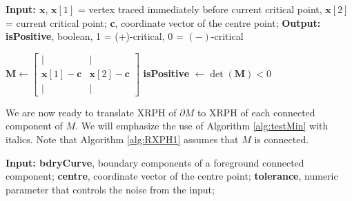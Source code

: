 \documentclass[a4paper,11pt]{article}
\theoremstyle{definition}
\begin{document}
\begin{algorithm}[H]
    \caption{\textbf{computeSign.}}\label{alg:testMin}
    \begin{algorithmic}
        \State \textbf{Input: $\boldsymbol{x}$}, $\boldsymbol{x}[1]$ =  vertex traced immediately before current critical point, 
        \State\;\;\;\;\;\;\;\;\;\;\;\;\;\;\;\;\;\;\;\;\;\;\;\;\;\;\;\;$\boldsymbol{x}[2]$ = current critical point;
        \State\;\;\;\;\;\;\;\;\;\;\;\; \textbf{c}, coordinate vector of the centre point;
        \State \textbf{Output: isPositive}, boolean, 1 = (+)-critical, 0 = $(-)$-critical
    

    \State $\boldsymbol{M}\gets \begin{bmatrix}
        \vert &  \vert\\
        \boldsymbol{x}[1]-\textbf{c} & \boldsymbol{x}[2]-\textbf{c}\\
        \vert &  \vert
    \end{bmatrix}$
    \State \textbf{isPositive} $\gets \det(\boldsymbol{M}) < 0$
    \end{algorithmic}
\end{algorithm}


We are now ready to translate XRPH of $\partial M$ to XRPH of each connected component of $M$. We will emphasize the use of Algorithm \ref{alg:testMin} with italics. Note that Algorithm \ref{alg:RXPH1} assumes that $M$ is connected. 

\begin{algorithm}[H]
\caption{\textbf{computeXRPH.} 
}\label{alg:RXPH1}
\begin{algorithmic} 
\State \textbf{Input: bdryCurve}, boundary components of a foreground connected component;
\State\;\;\;\;\;\;\;\;\;\;\;\; \textbf{centre}, coordinate vector of the centre point;
\State\;\;\;\;\;\;\;\;\;\;\;\; \textbf{tolerance}, numeric parameter that controls the noise from the input;
 \end{algorithmic} \end{algorithm}
\end{document}
